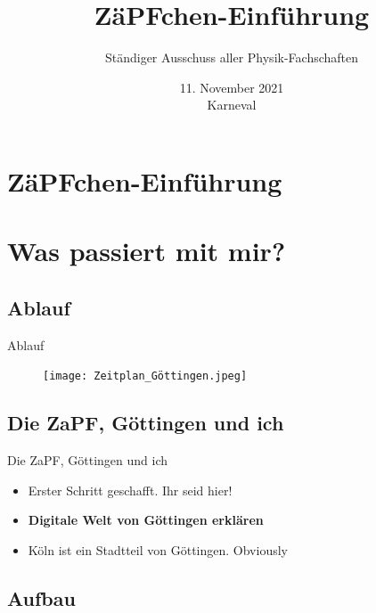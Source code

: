 \documentclass[compress,]{beamer}
\title[ZäPFchen-Einführung]{ZäPFchen-Einführung}
\author{Ständiger Ausschuss aller Physik-Fachschaften}
\institute[Zusammenkunft aller Physik-Fachschaften]
\date{11. November 2021\\Karneval}
\begin{document}
\begin{frame}
  \titlepage

\end{frame}

\section{ZäPFchen-Einführung}



\section{Was passiert mit mir?}

\subsection{Ablauf}

\begin{frame}{Ablauf}

  \begin{figure}
    \centering
    \texttt{[image: Zeitplan\_Göttingen.jpeg]}

  \end{figure}

\end{frame}


\subsection{Die ZaPF, Göttingen und ich}
\begin{frame}{Die ZaPF, Göttingen und ich}
  \begin{itemize}[<+->]
  \item Erster Schritt geschafft. Ihr seid hier!
  \item \textbf{Digitale Welt von Göttingen erklären}
  \item Köln ist ein Stadtteil von Göttingen. Obviously
  \end{itemize}

\end{frame}


\subsection{Aufbau}
\end{document}
